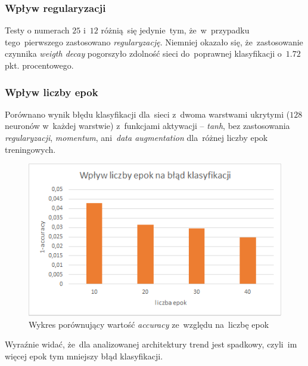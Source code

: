 \documentclass[11pt, a4paper]{article}
\begin{document}
 \subsubsection{Wpływ regularyzacji}
 Testy o numerach $25$ i~$12$ różnią~się jedynie~tym, że~w~przypadku tego~pierwszego zastosowano \textit{regularyzację}.
 Niemniej okazało się, że~zastosowanie czynnika \textit{weigth decay} pogorszyło zdolność sieci do~poprawnej klasyfikacji o~$1.72$ pkt. procentowego.
 
 \subsubsection{Wpływ liczby epok}

Porównano wynik błędu klasyfikacji dla~sieci z~dwoma warstwami ukrytymi ($128$ neuronów w~każdej warstwie) z~funkcjami aktywacji -- \textit{tanh},
bez zastosowania \textit{regularyzacji}, \textit{momentum}, ani~\textit{data augmentation} dla~różnej liczby epok treningowych.
\begin{figure}[H]
 \centering
 \includegraphics[scale=0.8]{epoki_nn.png}
 \caption{Wykres porównujący wartość \textit{accuracy} ze~względu na~liczbę epok}
\end{figure}

Wyraźnie widać, że~dla analizowanej architektury trend jest spadkowy, czyli~im więcej epok tym mniejszy błąd klasyfikacji.
\end{document}
